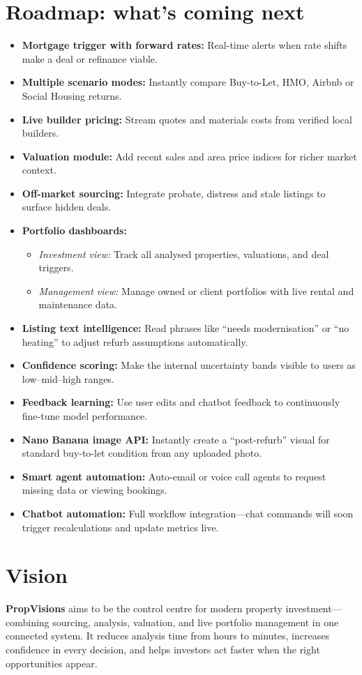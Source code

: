 \documentclass[11pt,a4paper]{article}
\begin{document}
\section*{Roadmap: what’s coming next}
\begin{itemize}
  \item \textbf{Mortgage trigger with forward rates:} Real-time alerts when rate shifts make a deal or refinance viable.
  \item \textbf{Multiple scenario modes:} Instantly compare Buy-to-Let, HMO, Airbnb or Social Housing returns.
  \item \textbf{Live builder pricing:} Stream quotes and materials costs from verified local builders.
  \item \textbf{Valuation module:} Add recent sales and area price indices for richer market context.
  \item \textbf{Off-market sourcing:} Integrate probate, distress and stale listings to surface hidden deals.
  \item \textbf{Portfolio dashboards:}
    \begin{itemize}
      \item \textit{Investment view:} Track all analysed properties, valuations, and deal triggers.
      \item \textit{Management view:} Manage owned or client portfolios with live rental and maintenance data.
    \end{itemize}
  \item \textbf{Listing text intelligence:} Read phrases like “needs modernisation” or “no heating” to adjust refurb assumptions automatically.
  \item \textbf{Confidence scoring:} Make the internal uncertainty bands visible to users as low–mid–high ranges.
  \item \textbf{Feedback learning:} Use user edits and chatbot feedback to continuously fine-tune model performance.
  \item \textbf{Nano Banana image API:} Instantly create a “post-refurb” visual for standard buy-to-let condition from any uploaded photo.
  \item \textbf{Smart agent automation:} Auto-email or voice call agents to request missing data or viewing bookings.
  \item \textbf{Chatbot automation:} Full workflow integration—chat commands will soon trigger recalculations and update metrics live.
\end{itemize}

\section*{Vision}
\textbf{PropVisions} aims to be the control centre for modern property investment—combining sourcing, analysis, valuation, and live portfolio management in one connected system.  
It reduces analysis time from hours to minutes, increases confidence in every decision, and helps investors act faster when the right opportunities appear.
\end{document}
